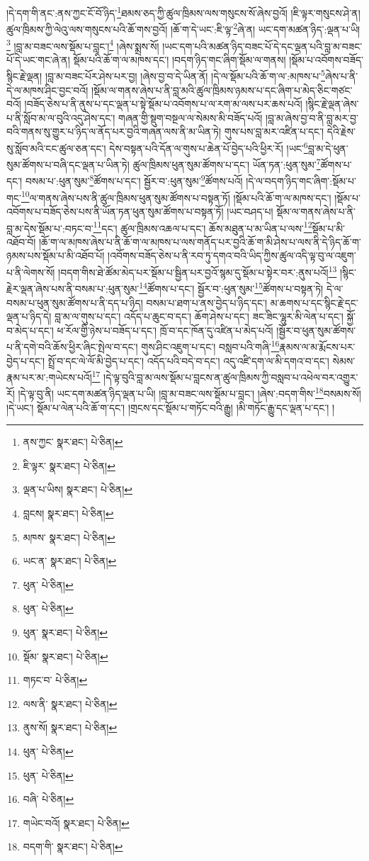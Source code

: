 །དེ་དག་གི་ནང་:ནས་ཀྱང་ངོ་བོ་ཉིད་\footnote{ནས་ཀྱང་  སྣར་ཐང་།  པེ་ཅིན། }ཐམས་ཅད་ཀྱི་ཚུལ་ཁྲིམས་ལས་གསུངས་སོ་ཞེས་བྱའོ། །ཇི་ལྟར་གསུངས་ཤེ་ན། ཚུལ་ཁྲིམས་ཀྱི་ལེའུ་ལས་གསུངས་པའི་ཆོ་གས་བྱའོ། །ཆོ་ག་དེ་ཡང་:ཇི་ལྟ་\footnote{ཇི་ལྟར་  སྣར་ཐང་།  པེ་ཅིན། }ཞེ་ན། ཡང་དག་མཚན་ཉིད་:ལྡན་པ་ཡི།\footnote{ལྡན་པ་ཡིས།  སྣར་ཐང་།  པེ་ཅིན། } །བླ་མ་བཟང་ལས་སྡོམ་པ་བླང་།\footnote{བླངས།  སྣར་ཐང་།  པེ་ཅིན། } །ཞེས་སྨྲས་སོ། །ཡང་དག་པའི་མཚན་ཉིད་བཟང་པོ་དེ་དང་ལྡན་པའི་བླ་མ་བཟང་པོ་དེ་ཡང་གང་ཞེ་ན། སྡོམ་པའི་ཆོ་ག་ལ་མཁས་དང་། །བདག་ཉིད་གང་ཞིག་སྡོམ་ལ་གནས། །སྡོམ་པ་འབོགས་བཟོད་སྙིང་རྗེ་ལྡན། །བླ་མ་བཟང་པོར་ཤེས་པར་བྱ། །ཞེས་བྱ་བ་དེ་ཡིན་ནོ། །དེ་ལ་སྡོམ་པའི་ཆོ་ག་ལ་:མཁས་པ་\footnote{མཁས་  སྣར་ཐང་།  པེ་ཅིན། }ཞེས་པ་ནི་དེ་ལ་མཁས་ཤིང་བྱང་བའོ། །སྡོམ་ལ་གནས་ཞེས་པ་ནི་བླ་མའི་ཚུལ་ཁྲིམས་ཉམས་པ་དང་ཞིག་པ་མེད་ཅིང་གཙང་བའོ། །བཟོད་ཅེས་པ་ནི་ནུས་པ་དང་ལྡན་པ་སྟེ་སྡོམ་པ་འབོགས་པ་ལ་རག་མ་ལས་པར་ཆས་པའོ། །སྙིང་རྗེ་ལྡན་ཞེས་པ་ནི་སློབ་མ་ལ་བུའི་འདུ་ཤེས་དང་། གཞན་གྱི་སྡུག་བསྔལ་ལ་སེམས་མི་བཟོད་པའོ། །བླ་མ་ཞེས་བྱ་བ་ནི་བླ་མར་བྱ་བའི་གནས་སུ་གྱུར་པ་ཉིད་ལ་ནོད་པར་བྱའི་གཞན་ལས་ནི་མ་ཡིན་ཏེ། གུས་པས་བླ་མར་འཛིན་པ་དང་། དེའི་རྗེས་སུ་སློབ་མའི་ངང་ཚུལ་ཅན་དང་། དེས་བསྟན་པའི་དོན་ལ་གུས་པ་ཆེན་པོ་བྱེད་པའི་ཕྱིར་རོ། །ཡང་\footnote{ཡང་ན་  སྣར་ཐང་།  པེ་ཅིན། }བླ་མ་དེ་ཕུན་སུམ་ཚོགས་པ་བཞི་དང་ལྡན་པ་ཡིན་ཏེ། ཚུལ་ཁྲིམས་ཕུན་སུམ་ཚོགས་པ་དང་། ཡོན་ཏན་:ཕུན་སུམ་\footnote{ཕུན་  པེ་ཅིན། }ཚོགས་པ་དང་། བསམ་པ་:ཕུན་སུམ་\footnote{ཕུན་  པེ་ཅིན། }ཚོགས་པ་དང་། སྦྱོར་བ་:ཕུན་སུམ་\footnote{ཕུན་  སྣར་ཐང་།  པེ་ཅིན། }ཚོགས་པའོ། །དེ་ལ་བདག་ཉིད་གང་ཞིག་:སྡོམ་པ་གང་\footnote{སྡོམ་  སྣར་ཐང་།  པེ་ཅིན། }ལ་གནས་ཞེས་པས་ནི་ཚུལ་ཁྲིམས་ཕུན་སུམ་ཚོགས་པ་བསྟན་ཏོ། །སྡོམ་པའི་ཆོ་ག་ལ་མཁས་དང་། །སྡོམ་པ་འབོགས་པ་བཟོད་ཅེས་པས་ནི་ཡོན་ཏན་ཕུན་སུམ་ཚོགས་པ་བསྟན་ཏོ། །ཡང་བཤད་པ། སྡོམ་ལ་གནས་ཞེས་པ་ནི་བླ་མ་དེས་སྡོམ་པ་:བཏང་བ་\footnote{གཏང་བ་  པེ་ཅིན། }དང་། ཚུལ་ཁྲིམས་འཆལ་པ་དང་། ཆོས་མཐུན་པ་མ་ཡིན་པ་ལས་\footnote{ལས་ནི་  སྣར་ཐང་།  པེ་ཅིན། }སྡོམ་པ་མི་འཐོབ་བོ། །ཆོ་ག་ལ་མཁས་ཞེས་པ་ནི་ཆོ་ག་ལ་མཁས་པ་ལས་གནོད་པར་བྱའི་ཆོ་ག་མི་ཤེས་པ་ལས་ནི་དེ་ཉིད་ཆོ་ག་ཉམས་པས་སྡོམ་པ་མི་འཐོབ་པོ། །འབོགས་བཟོད་ཅེས་པ་ནི་རབ་ཏུ་དགའ་བའི་ཡིད་ཀྱིས་ཚུལ་འདི་ལྟ་བུ་ལ་འཇུག་པ་ནི་ལེགས་སོ། །བདག་གིས་ཐེ་ཚོམ་མེད་པར་སྡོམ་པ་སྦྱིན་པར་བྱའོ་སྙམ་དུ་སྡོམ་པ་སྟེར་བར་:ནུས་པའོ།\footnote{ནུས་སོ།  སྣར་ཐང་།  པེ་ཅིན། } །སྙིང་རྗེར་ལྡན་ཞེས་པས་ནི་བསམ་པ་:ཕུན་སུམ་\footnote{ཕུན་  པེ་ཅིན། }ཚོགས་པ་དང་། སྦྱོར་བ་:ཕུན་སུམ་\footnote{ཕུན་  པེ་ཅིན། }ཚོགས་པ་བསྟན་ཏེ། དེ་ལ་བསམ་པ་ཕུན་སུམ་ཚོགས་པ་ནི་དད་པ་ཉིད། བསམ་པ་ཐག་པ་ནས་བྱེད་པ་ཉིད་དང་། མ་ཆགས་པ་དང་སྙིང་རྗེ་དང་ལྡན་པ་ཉིད་དེ། བླ་མ་ལ་གུས་པ་དང་། འདོད་པ་ཆུང་བ་དང་། ཆོག་ཤེས་པ་དང་། ཟང་ཟིང་ལྷུར་མི་ལེན་པ་དང་། སྐྱོ་བ་མེད་པ་དང་། ཕ་རོལ་གྱི་ཉེས་པ་བཟོད་པ་དང་། ཁྲོ་བ་དང་ཁོན་དུ་འཛིན་པ་མེད་པའོ། །སྦྱོར་བ་ཕུན་སུམ་ཚོགས་པ་ནི་དགེ་བའི་ཆོས་ཕྱིར་ཞིང་སྤེལ་བ་དང་། གུས་ཤིང་འཇུག་པ་དང་། བསླབ་པའི་གཞི་\footnote{བཞི་  པེ་ཅིན། }རྣམས་ལ་མ་རྨོངས་པར་བྱེད་པ་དང་། སྤྲོ་བ་དང་ལེ་ལོ་མི་བྱེད་པ་དང་། འདོད་པའི་བདེ་བ་དང་། འདུ་འཛི་དག་ལ་མི་དགའ་བ་དང་། སེམས་རྣམ་པར་མ་:གཡེངས་པའོ།\footnote{གཡེང་བའོ།  སྣར་ཐང་།  པེ་ཅིན། } །དེ་ལྟ་བུའི་བླ་མ་ལས་སྡོམ་པ་བླངས་ན་ཚུལ་ཁྲིམས་ཀྱི་བསླབ་པ་འཕེལ་བར་འགྱུར་རོ། །དེ་ལྟ་བུ་ནི། ཡང་དག་མཚན་ཉིད་ལྡན་པ་ཡི། །བླ་མ་བཟང་ལས་སྡོམ་པ་བླང་། །ཞེས་:བདག་གིས་\footnote{བདག་གི་  སྣར་ཐང་།  པེ་ཅིན། }བསམས་སོ། །དེ་ཡང་། སྡོམ་པ་ལེན་པའི་ཆོ་ག་དང་། །གྲངས་དང་སྡོམ་པ་གཏོང་བའི་རྒྱུ། །མི་གཏོང་རྒྱུ་དང་ལྡན་པ་དང་། །
